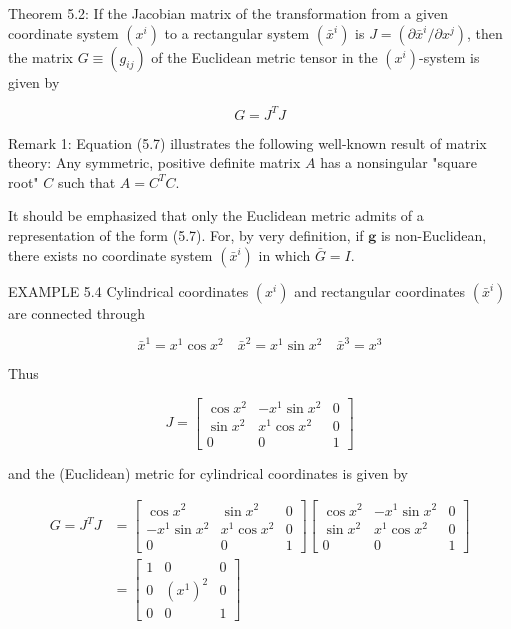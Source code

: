 \documentclass[10pt]{article}
\begin{document}
Theorem 5.2: If the Jacobian matrix of the transformation from a given coordinate system $\left(x^{i}\right)$ to a rectangular system $\left(\bar{x}^{i}\right)$ is $J=\left(\partial \bar{x}^{i} / \partial x^{j}\right)$, then the matrix $G \equiv\left(g_{i j}\right)$ of the Euclidean metric tensor in the $\left(x^{i}\right)$-system is given by


\begin{equation*}
G=J^{T} J \tag{5.7}
\end{equation*}


Remark 1: Equation (5.7) illustrates the following well-known result of matrix theory: Any symmetric, positive definite matrix $A$ has a nonsingular "square root" $C$ such that $A=C^{T} C$.

It should be emphasized that only the Euclidean metric admits of a representation of the form (5.7). For, by very definition, if $\mathbf{g}$ is non-Euclidean, there exists no coordinate system $\left(\bar{x}^{i}\right)$ in which $\bar{G}=I$.

EXAMPLE 5.4 Cylindrical coordinates $\left(x^{i}\right)$ and rectangular coordinates $\left(\bar{x}^{i}\right)$ are connected through

$$
\bar{x}^{1}=x^{1} \cos x^{2} \quad \bar{x}^{2}=x^{1} \sin x^{2} \quad \bar{x}^{3}=x^{3}
$$

Thus

$$
J=\left[\begin{array}{ccc}
\cos x^{2} & -x^{1} \sin x^{2} & 0 \\
\sin x^{2} & x^{1} \cos x^{2} & 0 \\
0 & 0 & 1
\end{array}\right]
$$

and the (Euclidean) metric for cylindrical coordinates is given by

$$
\begin{aligned}
G=J^{T} J & =\left[\begin{array}{ccc}
\cos x^{2} & \sin x^{2} & 0 \\
-x^{1} \sin x^{2} & x^{1} \cos x^{2} & 0 \\
0 & 0 & 1
\end{array}\right]\left[\begin{array}{ccc}
\cos x^{2} & -x^{1} \sin x^{2} & 0 \\
\sin x^{2} & x^{1} \cos x^{2} & 0 \\
0 & 0 & 1
\end{array}\right] \\
& =\left[\begin{array}{ccc}
1 & 0 & 0 \\
0 & \left(x^{1}\right)^{2} & 0 \\
0 & 0 & 1
\end{array}\right]
\end{aligned}
$$
\end{document}

